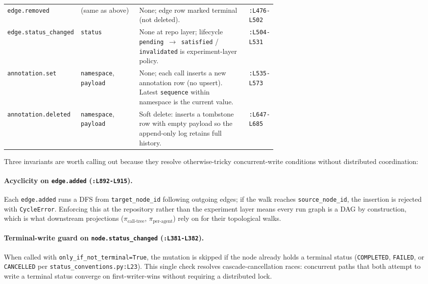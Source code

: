 \documentclass{article}
\begin{document}
\begin{table}[h]
\begin{tabular}{@{}l>{\raggedright\arraybackslash}p{0.22\linewidth}>{\raggedright\arraybackslash}p{0.42\linewidth}l@{}}
\texttt{edge.removed}          & (same as above)                                                                                             & None; edge row marked terminal (not deleted).                                                                                       & \texttt{:L476-L502} \\
\texttt{edge.status\_changed}  & \texttt{status}                                                                                             & None at repo layer; lifecycle \texttt{pending}~$\to$~\texttt{satisfied} / \texttt{invalidated} is experiment-layer policy.          & \texttt{:L504-L531} \\
\texttt{annotation.set}        & \texttt{namespace}, \texttt{payload}                                                                        & None; each call inserts a new annotation row (no upsert). Latest \texttt{sequence} within namespace is the current value.           & \texttt{:L535-L573} \\
\texttt{annotation.deleted}    & \texttt{namespace}, \texttt{payload}                                                                        & Soft delete: inserts a tombstone row with empty payload so the append-only log retains full history.                                & \texttt{:L647-L685} \\
\bottomrule
\end{tabular}
\end{table}

Three invariants are worth calling out because they resolve
otherwise-tricky concurrent-write conditions without
distributed coordination:

\paragraph{Acyclicity on \texttt{edge.added}
(\texttt{:L892-L915}).} Each \texttt{edge.added} runs a DFS
from \texttt{target\_node\_id} following outgoing edges; if
the walk reaches \texttt{source\_node\_id}, the insertion is
rejected with \texttt{CycleError}. Enforcing this at the
repository rather than the experiment layer means every run
graph is a DAG by construction, which is what downstream
projections ($\pi_{\text{call-tree}}$,
$\pi_{\text{per-agent}}$) rely on for their topological walks.

\paragraph{Terminal-write guard on
\texttt{node.status\_changed} (\texttt{:L381-L382}).} When
called with \texttt{only\_if\_not\_terminal=True}, the mutation
is skipped if the node already holds a terminal status
(\texttt{COMPLETED}, \texttt{FAILED}, or \texttt{CANCELLED}
per \texttt{status\_conventions.py:L23}). This single check
resolves cascade-cancellation races: concurrent paths that
both attempt to write a terminal status converge on
first-writer-wins without requiring a distributed lock.
\end{document}
